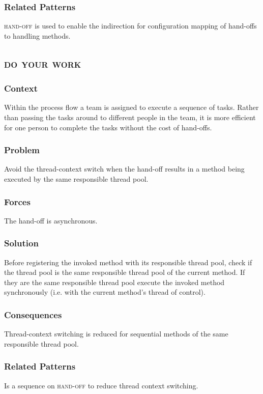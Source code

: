 \documentclass[prodmode]{style/acmlarge}
\begin{document}
\subsubsection*{Related Patterns} \textsc{hand-off} is used to enable the
indirection for configuration mapping of hand-offs to handling methods.




\subsection{\textsc{\textbf{do your work}}}

\subsubsection*{Context} Within the process flow a team is assigned to execute a
sequence of tasks. Rather than passing the tasks around to different people in
the team, it is more efficient for one person to complete the tasks without the
cost of hand-offs.

\subsubsection*{Problem} Avoid the thread-context switch when the hand-off
results in a method being executed by the same responsible thread pool.

\subsubsection*{Forces} The hand-off is asynchronous.

\subsubsection*{Solution} Before registering the invoked method with its
responsible thread pool, check if the thread pool is the same responsible thread
pool of the current method.  If they are the same responsible thread pool
execute the invoked method synchronously (i.e. with the current method's thread
of control).

\subsubsection*{Consequences} Thread-context switching is reduced for sequential
methods of the same responsible thread pool.

\subsubsection*{Related Patterns} Is a sequence on \textsc{hand-off} to reduce
thread context switching.
\end{document}
